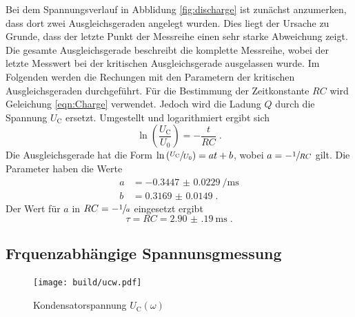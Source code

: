 \noindent Bei dem Spannungsverlauf in Abblidung \ref{fig:discharge} ist zunächst anzumerken, dass dort zwei Ausgleichsgeraden angelegt wurden. 
Dies liegt der Ursache zu Grunde, dass der letzte Punkt der Messreihe einen sehr starke Abweichung zeigt.
Die gesamte Ausgleichsgerade beschreibt die komplette Messreihe, wobei der letzte Messwert bei der kritischen Ausgleichsgerade ausgelassen wurde.
Im Folgenden werden die Rechungen mit den Parametern der kritischen Ausgleichsgeraden durchgeführt.
Für die Bestimmung der Zeitkonstante $RC$ wird Geleichung \eqref{eqn:Charge} verwendet.
Jedoch wird die Ladung $Q$ durch die Spannung $U_\text{C}$ ersetzt.
Umgestellt und logarithmiert ergibt sich 
\begin{equation}
    \ln \left( \frac{U_\text{C}}{U_0} \right ) =  - \frac{t}{RC} \; \text{.} 
\end{equation} 
Die Ausgleichsgerade hat die Form $ \ln \left( \sfrac{U_\text{C}}{U_0} \right ) = at + b$, wobei $a = - \sfrac{1}{RC}$ gilt.
Die Parameter haben die Werte 
\begin{align*}
    a &= \SI{-0.3447(229)}{\per\milli\second} \\
    b &= \num{0.3169(149)} \; \text{.}
\end{align*}
Der Wert für $a$ in $RC = - \sfrac{1}{a}$ eingesetzt ergibt
\begin{equation*}
    \tau = RC = \SI{2.90(19)}{\milli\second} \; \text{.}
\end{equation*}
\subsection{Frquenzabhängige Spannunsgmessung}
\begin{figure}
    \centering
    \caption{Kondensatorspannung $U_\text{C} \left( \omega \right)$}
    \label{fig:ucw}
    \texttt{[image: build/ucw.pdf]}
\end{figure}